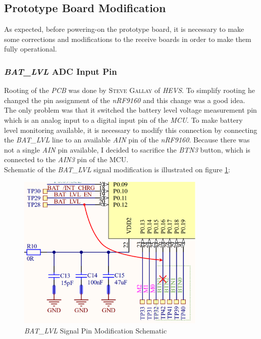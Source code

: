 \documentclass[Report.tex]{subfiles}
\begin{document}
\subsection{Prototype Board Modification}
As expected, before powering-on the prototype board, it is necessary to make some corrections and modifications to the receive boards in order to make them fully operational.

\subsubsection{\textit{BAT\_LVL} ADC Input Pin}
Rooting of the \textit{PCB} was done by \textsc{Steve Gallay} of \textit{HEVS}. To simplify rooting he changed the pin assignment of the \textit{nRF9160} and this change was a good idea. The only problem was that it switched the battery level voltage measurement pin which is an analog input to a digital input pin of the \textit{MCU}. To make battery level monitoring available, it is necessary to modify this connection by connecting the \textit{BAT\_LVL} line to an available \textit{AIN} pin of the \textit{nRF9160}. Because there was not a single \textit{AIN} pin available, I decided to sacrifice the \textit{BTN3} button, which is connected to the \textit{AIN3} pin of the MCU.\\

Schematic of the \textit{BAT\_LVL} signal modification is illustrated on figure \ref{fig:adc_mod}:
\begin{figure}[H]
	\centering
	\includegraphics[width=0.8\textwidth]{Include/Figure/modification/adc_mod}
	\caption{\textit{BAT\_LVL} Signal Pin Modification Schematic}
	\label{fig:adc_mod}
\end{figure}
\end{document}
